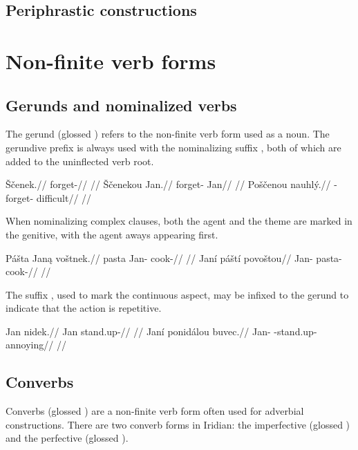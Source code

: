 \subsection{Periphrastic constructions}


\section{Non-finite verb forms}

\subsection{Gerunds and nominalized verbs}
\par The gerund (glossed ) refers to the non-finite verb form used as a noun. The gerundive prefix  is always used with the nominalizing suffix , both of which are added to the uninflected verb root.

\pex
\a
\begingl
\gla Ščenek.//
\glb forget-//
\glft {}//
\endgl
\a
\begingl
\gla Ščenekou Jan.//
\glb forget- Jan//
\glft {}//
\endgl
\a
\begingl
\gla Poščenou nauhl\'y.//
\glb {}-forget- difficult//
\glft {}//
\endgl
\xe

When nominalizing complex clauses, both the agent and the theme are marked in the genitive, with the agent aways appearing first.

\pex
\a
\begingl
\gla Pášta Jan\k{a} voštnek.//
\glb pasta Jan- cook-//
\glft {}//
\endgl
\a
\begingl
\gla Janí páští povoštou//
\glb Jan- pasta- cook-//
\glft {}//
\endgl
\xe

The suffix , used to mark the continuous aspect, may be infixed to the gerund to indicate that the action is repetitive.

\pex
\a
\begingl
\gla Jan nidek.//
\glb Jan stand.up-//
\glft {}//
\endgl
\a
\begingl
\gla Janí ponidálou buvec.//
\glb Jan- -stand.up- annoying//
\glft {}//
\endgl
\xe

\subsection{Converbs}
Converbs (glossed ) are a non-finite verb form often used for adverbial constructions. There are two converb forms in Iridian: the imperfective  (glossed ) and the perfective  (glossed ).

